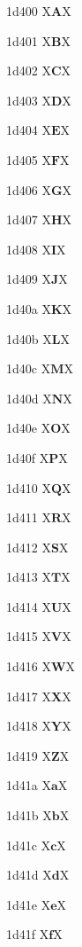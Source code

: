 \documentclass[11pt]{article}
\begin{document}
\newcommand{\mathbfscr}{} %
\newcommand{\mathbffrak}{} %
\newcommand{\mathsfbfsl}{} %
1d400 X{\ensuremath{\mathbf{A}}}X

1d401 X{\ensuremath{\mathbf{B}}}X

1d402 X{\ensuremath{\mathbf{C}}}X

1d403 X{\ensuremath{\mathbf{D}}}X

1d404 X{\ensuremath{\mathbf{E}}}X

1d405 X{\ensuremath{\mathbf{F}}}X

1d406 X{\ensuremath{\mathbf{G}}}X

1d407 X{\ensuremath{\mathbf{H}}}X

1d408 X{\ensuremath{\mathbf{I}}}X

1d409 X{\ensuremath{\mathbf{J}}}X

1d40a X{\ensuremath{\mathbf{K}}}X

1d40b X{\ensuremath{\mathbf{L}}}X

1d40c X{\ensuremath{\mathbf{M}}}X

1d40d X{\ensuremath{\mathbf{N}}}X

1d40e X{\ensuremath{\mathbf{O}}}X

1d40f X{\ensuremath{\mathbf{P}}}X

1d410 X{\ensuremath{\mathbf{Q}}}X

1d411 X{\ensuremath{\mathbf{R}}}X

1d412 X{\ensuremath{\mathbf{S}}}X

1d413 X{\ensuremath{\mathbf{T}}}X

1d414 X{\ensuremath{\mathbf{U}}}X

1d415 X{\ensuremath{\mathbf{V}}}X

1d416 X{\ensuremath{\mathbf{W}}}X

1d417 X{\ensuremath{\mathbf{X}}}X

1d418 X{\ensuremath{\mathbf{Y}}}X

1d419 X{\ensuremath{\mathbf{Z}}}X

1d41a X{\ensuremath{\mathbf{a}}}X

1d41b X{\ensuremath{\mathbf{b}}}X

1d41c X{\ensuremath{\mathbf{c}}}X

1d41d X{\ensuremath{\mathbf{d}}}X

1d41e X{\ensuremath{\mathbf{e}}}X

1d41f X{\ensuremath{\mathbf{f}}}X
\end{document}
